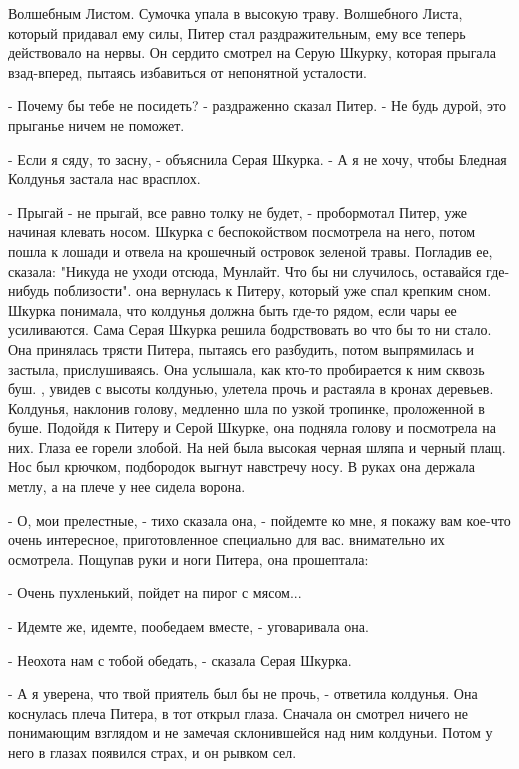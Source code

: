 Волшебным Листом. Сумочка упала в высокую траву.
 Волшебного Листа, который придавал ему силы, Питер стал 
раздражительным, ему все теперь действовало на нервы. Он сердито 
смотрел на Серую Шкурку, которая прыгала взад-вперед, пытаясь 
избавиться от непонятной усталости.
\par- Почему бы тебе не посидеть? - раздраженно сказал Питер. - Не 
будь дурой, это прыганье ничем не поможет.
\par- Если я сяду, то засну, - объяснила Серая Шкурка. - А я не хочу, 
чтобы Бледная Колдунья застала нас врасплох.
\par- Прыгай - не прыгай, все равно толку не будет, - пробормотал 
Питер, уже начиная клевать носом.
 Шкурка с беспокойством посмотрела на него, потом пошла к 
лошади и отвела на крошечный островок зеленой травы. Погладив ее, 
сказала: "Никуда не уходи отсюда, Мунлайт. Что бы ни случилось, 
оставайся где-нибудь поблизости".
 она вернулась к Питеру, который уже спал крепким сном.
 Шкурка понимала, что колдунья должна быть где-то рядом, если 
чары ее усиливаются. Сама Серая Шкурка решила бодрствовать во что бы 
то ни стало. Она принялась трясти Питера, пытаясь его разбудить, потом 
выпрямилась и застыла, прислушиваясь. Она услышала, как кто-то 
пробирается к ним сквозь буш.
, увидев с высоты колдунью, улетела прочь и растаяла в 
кронах деревьев. Колдунья, наклонив голову, медленно шла по узкой 
тропинке, проложенной в буше. Подойдя к Питеру и Серой Шкурке, она 
подняла голову и посмотрела на них. Глаза ее горели злобой. На ней 
была высокая черная шляпа и черный плащ. Нос был крючком, подбородок 
выгнут навстречу носу. В руках она держала метлу, а на плече у нее 
сидела ворона.
\par- О, мои прелестные, - тихо сказала она, - пойдемте ко мне, я 
покажу вам кое-что очень интересное, приготовленное специально для 
вас.
 внимательно их осмотрела. Пощупав руки и ноги Питера, она 
прошептала:
\par- Очень пухленький, пойдет на пирог с мясом...
\par- Идемте же, идемте, пообедаем вместе, - уговаривала она.
\par- Неохота нам с тобой обедать, - сказала Серая Шкурка.
\par- А я уверена, что твой приятель был бы не прочь, - ответила 
колдунья. Она коснулась плеча Питера, в тот открыл глаза. Сначала он 
смотрел ничего не понимающим взглядом и не замечая склонившейся над 
ним колдуньи. Потом у него в глазах появился страх, и он рывком сел.
